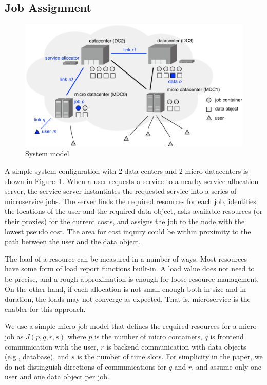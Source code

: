 \subsection{Job Assignment}

\begin{figure}[tb]
  \begin{center}
    \includegraphics[width=1.0\columnwidth]{system.pdf}
    \vspace{-2.0ex}
    \caption{System model}
    \label{fig:system}
  \end{center}
\end{figure}

A simple system configuration with 2 data centers and 2
micro-datacenters is shown in Figure~\ref{fig:system}.
When a user requests a service to a nearby service allocation server,
the service server instantiates the requested service into a series of
microservice jobs.
The server finds the required resources for each job,
identifies the locations of the user and the required data object,
asks available resources (or their proxies) for the current costs,
and assigns the job to the node with the lowest pseudo cost.
The area for cost inquiry could be within proximity to the path
between the user and the data object.

The load of a resource can be measured in a number of ways.  Most
resources have some form of load report functions built-in.
A load value does not need to be precise, and a rough approximation is
enough for loose resource management.
On the other hand, if each allocation is not small enough both in size
and in duration, the loads may not converge as expected.
That is, microservice is the enabler for this approach.

We use a simple micro job model that defines the required resources
for a micro-job as $J(p, q, r, s)$ where 
$p$ is the number of micro containers, 
$q$ is frontend communication with the user, 
$r$ is backend communication with data objects (e.g., database), and
$s$ is the number of time slots.
For simplicity in the paper, we do not distinguish directions of
communications for $q$ and $r$, and assume only one user and one data
object per job.

